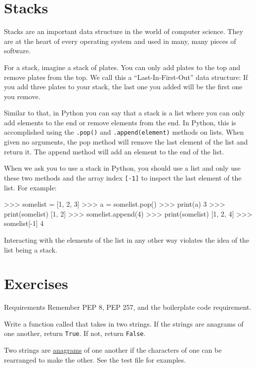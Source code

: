 \documentclass[11pt]{cselabheader}
\begin{document}
\pagebreak
\section{Stacks}
\label{sec:stacks}

Stacks are an important data structure in the world of computer
science. They are at the heart of every operating system and used in many, many
pieces of software.

For a stack, imagine a stack of plates. You can only add plates to the top and
remove plates from the top. We call this a ``Last-In-First-Out'' data structure:
If you add three plates to your stack, the last one you added will be the first
one you remove.

Similar to that, in Python you can say that a stack
is a list where you can only add elements to the end or remove elements from the
end. In Python, this is accomplished using the
\lstinline!.pop()! and \lstinline!.append(element)! methods on lists. When given
no arguments, the pop method will remove the last element of the list and return
it. The append method will add an element to the end of the list.

When we ask you to use a stack in Python, you should use a list and only use
these two methods and the array index \lstinline![-1]! to inspect the last
element of the list. For example:

\begin{pyconcode}
>>> somelist = [1, 2, 3]
>>> a = somelist.pop()
>>> print(a)
3
>>> print(somelist)
[1, 2]
>>> somelist.append(4)
>>> print(somelist)
[1, 2, 4]
>>> somelist[-1]
4
\end{pyconcode}

Interacting with the elements of the list in any other way violates the
idea of the list being a stack.

\pagebreak

\section{Exercises}
\label{sec:ex}

\begin{warningbox}{Requirements}
  Remember PEP 8, PEP 257, and the boilerplate code requirement.
\end{warningbox}

\begin{ex}[anagrams.py] Write a function called  
  that takes in two strings. If the strings are anagrams of one another, 
  return \lstinline{True}. If not, return \lstinline{False}.

  Two strings are \href{http://en.wikipedia.org/wiki/Anagram}{anagrams} of one
  another if the characters of one can be rearranged to make the other.
  See the test file for examples.
\end{ex}
\end{document}
